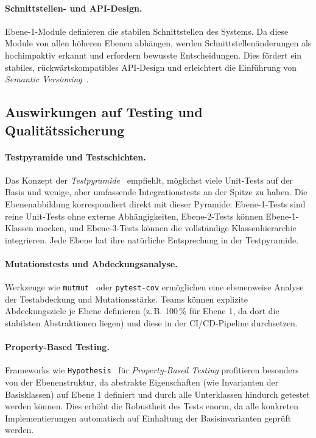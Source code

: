 ﻿\documentclass[a4paper,12pt]{article}
\begin{document}
\paragraph{Schnittstellen- und API-Design.}
Ebene-1-Module definieren die stabilen Schnittstellen des Systems. Da diese
Module von allen höheren Ebenen abhängen, werden Schnittstellenänderungen als
hochimpaktiv erkannt und erfordern bewusste Entscheidungen. Dies fördert ein
stabiles, rückwärtskompatibles API-Design und erleichtert die Einführung von
\textit{Semantic Versioning}~\cite{semver2024}.

\subsection{Auswirkungen auf Testing und Qualitätssicherung}

\paragraph{Testpyramide und Testschichten.}
Das Konzept der \textit{Testpyramide}~\cite{fowler2012} empfiehlt, möglichst
viele Unit-Tests auf der Basis und wenige, aber umfassende Integrationstests
an der Spitze zu haben. Die Ebenenabbildung korrespondiert direkt mit dieser
Pyramide: Ebene-1-Tests sind reine Unit-Tests ohne externe Abhängigkeiten,
Ebene-2-Tests können Ebene-1-Klassen mocken, und Ebene-3-Tests können die
vollständige Klassenhierarchie integrieren. Jede Ebene hat ihre natürliche
Entsprechung in der Testpyramide.

\paragraph{Mutationstests und Abdeckungsanalyse.}
Werkzeuge wie \texttt{mutmut}~\cite{mutmut2024} oder \texttt{pytest-\newline cov}
ermöglichen eine ebenenweise Analyse der Testabdeckung und Mutationsstärke.
Teams können explizite Abdeckungsziele je Ebene definieren (z.\,B. 100\,\%
für Ebene 1, da dort die stabilsten Abstraktionen liegen) und diese in der
CI/CD-Pipeline durchsetzen.

\paragraph{Property-Based Testing.}
Frameworks wie \texttt{Hypothesis}~\cite{hypothesis2024} für
\textit{Property-Based Testing} profitieren besonders von der Ebenenstruktur,
da abstrakte Eigenschaften (wie Invarianten der Basisklassen) auf Ebene 1
definiert und durch alle Unterklassen hindurch getestet werden können. Dies
erhöht die Robustheit des Tests enorm, da alle konkreten Implementierungen
automatisch auf Einhaltung der Basisinvarianten geprüft werden.
\end{document}

